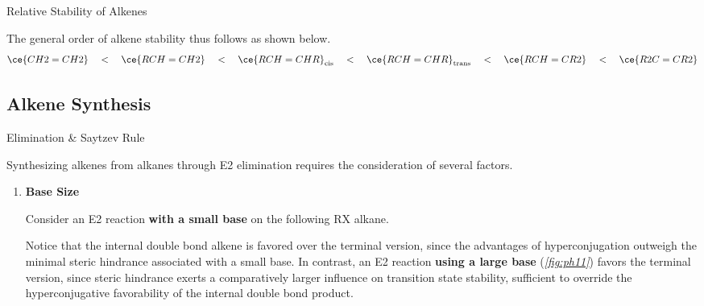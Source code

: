 \documentclass[10pt]{article}
\begin{document}
\begin{core}{Relative Stability of Alkenes}
\begin{enumerate}
    \end{enumerate}

    The general order of alkene stability thus follows as shown below.
    \[
      \ce{CH2=CH2} \quad < \quad \ce{RCH=CH2} \quad < \quad \ce{RCH=CHR}_{\text{cis}} \quad < \quad \ce{RCH=CHR}_{\text{trans}} \quad < \quad \ce{RCH=CR2} \quad < \quad \ce{R2C=CR2}
    \]

  \end{core}

  \subsection{Alkene Synthesis}

    \begin{core}{Elimination \& Saytzev Rule}

      Synthesizing alkenes from alkanes through E2 elimination requires the consideration of several factors.

      \begin{enumerate}

        \item \textbf{Base Size}

        Consider an E2 reaction \textbf{with a small base} on the following RX alkane.


        Notice that the internal double bond alkene is favored over the terminal version, since the advantages of hyperconjugation outweigh the minimal steric hindrance associated with a small base. In contrast, an E2 reaction \textbf{using a large base} (\textit{\autoref{fig:ph11}}) favors the terminal version, since steric hindrance exerts a comparatively larger influence on transition state stability, sufficient to override the hyperconjugative favorability of the internal double bond product.


\end{enumerate}
\end{core}
\end{document}
